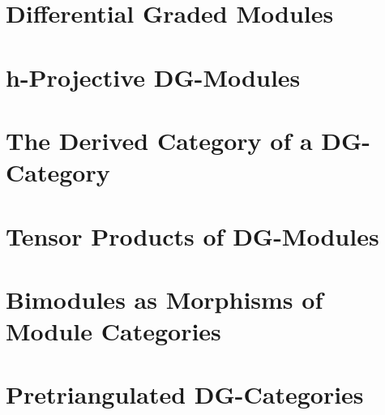 \section{Differential Graded Modules}\label{subsection: dg modules}


\section{h-Projective DG-Modules}


\section{The Derived Category of a DG-Category}


\section{Tensor Products of DG-Modules}


\section{Bimodules as Morphisms of Module Categories}


\section{Pretriangulated DG-Categories}

